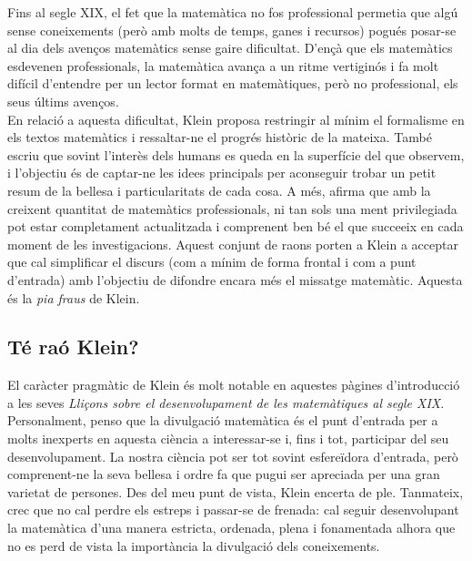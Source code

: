 \documentclass[a4paper, 11pt]{article}
\begin{document}
Fins al segle XIX, el fet que la matemàtica no fos professional permetia que algú sense coneixements (però amb molts de
temps, ganes i recursos) pogués posar-se al dia dels avenços matemàtics sense gaire dificultat. D'ençà que els
matemàtics esdevenen professionals, la matemàtica avança a un ritme vertiginós i fa molt difícil d'entendre per un
lector format en matemàtiques, però no professional, els seus últims avenços.\\
En relació a aquesta dificultat, Klein proposa restringir al mínim el formalisme en els textos matemàtics i
ressaltar-ne el progrés històric de la mateixa. També escriu que sovint l'interès dels humans es queda en la superfície
del que observem, i l'objectiu és de captar-ne les idees principals per aconseguir trobar un petit resum de la bellesa
i particularitats de cada cosa. A més, afirma que amb la creixent quantitat de matemàtics professionals, ni tan sols
una ment privilegiada pot estar completament actualitzada i comprenent ben bé el que succeeix en cada moment de les
investigacions. Aquest conjunt de raons porten a Klein a acceptar que cal simplificar el discurs (com a mínim de forma
frontal i com a punt d'entrada) amb l'objectiu de difondre encara més el missatge matemàtic. Aquesta és la \textit{pia
  fraus} de Klein.

\subsection*{Té raó Klein?}
El caràcter pragmàtic de Klein és molt notable en aquestes pàgines d'introducció a les seves \textit{Lliçons sobre el
  desenvolupament de les matemàtiques al segle XIX}. Personalment, penso que la divulgació matemàtica és el punt
d'entrada per a molts inexperts en aquesta ciència a interessar-se i, fins i tot, participar del seu desenvolupament.
La nostra ciència pot ser tot sovint esfereïdora d'entrada, però comprenent-ne la seva bellesa i ordre fa que pugui ser
apreciada per una gran varietat de persones. Des del meu punt de vista, Klein encerta de ple. Tanmateix, crec que no
cal perdre els estreps i passar-se de frenada: cal seguir desenvolupant la matemàtica d'una manera estricta, ordenada,
plena i fonamentada alhora que no es perd de vista la importància la divulgació dels coneixements.
\end{document}
